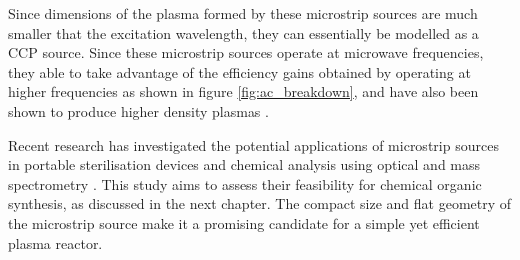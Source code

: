 Since dimensions of the plasma formed by these microstrip sources are much smaller that the excitation wavelength, they can essentially be modelled as a CCP source. Since these microstrip sources operate at microwave frequencies, they able to take advantage of the efficiency gains obtained by operating at higher frequencies as shown in figure \ref{fig:ac_breakdown}, and have also been shown to produce higher density plasmas \cite{Surendra1998}. 

Recent research has investigated the potential applications of microstrip sources in portable sterilisation devices \cite{Pollak2008} and chemical analysis using optical and mass spectrometry \cite{Karanassios2005}. This study aims to assess their feasibility for chemical organic synthesis, as discussed in the next chapter. The compact size and flat geometry of the microstrip source make it a promising candidate for a simple yet efficient plasma reactor.



